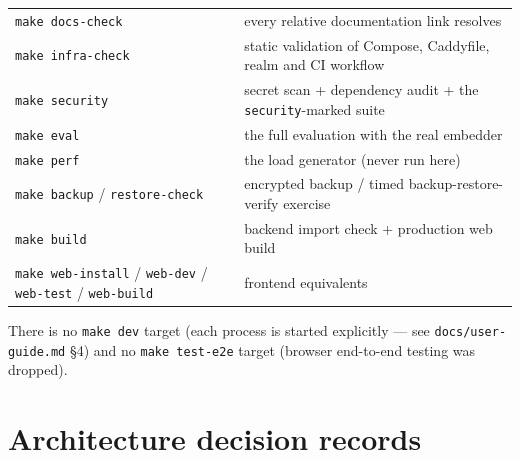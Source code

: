 \documentclass[11pt,a4paper]{article}
\begin{document}
\begin{table}[h]
\begin{tabularx}{\linewidth}{@{}L{3.6cm}Y@{}}
\texttt{make docs-check} & every relative documentation link resolves\\
\texttt{make infra-check} & static validation of Compose, Caddyfile, realm and CI workflow\\
\texttt{make security} & secret scan + dependency audit + the \texttt{security}-marked suite\\
\texttt{make eval} & the full evaluation with the real embedder\\
\texttt{make perf} & the load generator (never run here)\\
\texttt{make backup} / \texttt{restore-check} & encrypted backup / timed backup-restore-verify exercise\\
\texttt{make build} & backend import check + production web build\\
\texttt{make web-install} / \texttt{web-dev} / \texttt{web-test} / \texttt{web-build} & frontend equivalents\\
\bottomrule
\end{tabularx}
\end{table}

There is no \texttt{make dev} target (each process is started explicitly --- see
\texttt{docs/user-guide.md} \S4) and no \texttt{make test-e2e} target (browser
end-to-end testing was dropped).

\clearpage
\section{Architecture decision records}
\end{document}

